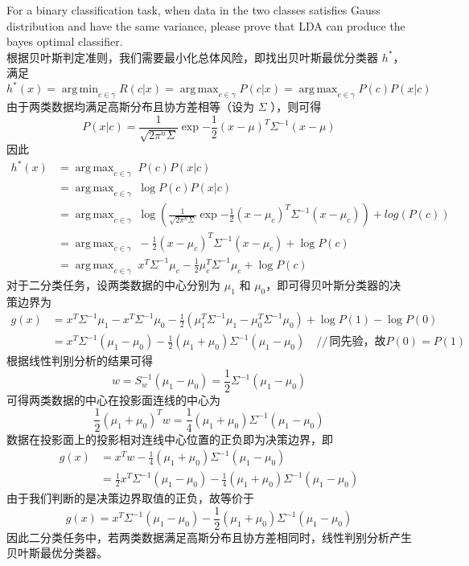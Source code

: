 \documentclass{article}
\DeclareMathOperator*{\argmax}{arg\,max}
\DeclareMathOperator*{\argmin}{arg\,min}
\begin{document}
	For a binary classification task, when data in the two classes satisfies Gauss distribution and have the same variance, please prove that LDA can produce the bayes optimal classifier. \\
	根据贝叶斯判定准则，我们需要最小化总体风险，即找出贝叶斯最优分类器 $h^*$，满足 
	\[h^*(x) = \argmin_{c\in\gamma} R(c|x) = \argmax_{c\in\gamma}P(c|x) = \argmax_{c\in\gamma} P(c)P(x|c) \]
	由于两类数据均满足高斯分布且协方差相等（设为 $\Sigma$ ），则可得
	\[ P(x|c) = \frac{1}{\sqrt{2\pi^{n}\Sigma}}\exp{-\frac{1}{2}(x-\mu)^T\Sigma^{-1}(x-\mu)} \]
	因此
	\begin{align*}
	h^*(x)
	&= \argmax_{c\in\gamma}\;P(c)P(x|c) \\
	&= \argmax_{c\in\gamma}\;\log P(c)P(x|c) \\
	&= \argmax_{c\in\gamma}\;\log(\frac{1}{\sqrt{2\pi^{n}\Sigma}}\exp{-\frac{1}{2}(x-\mu_c)^T\Sigma^{-1}(x-\mu_c)}) + log(P(c)) \\
	&= \argmax_{c\in\gamma}\;-\frac{1}{2}(x-\mu_c)^T\Sigma^{-1}(x-\mu_c) + \log P(c) \\
	&= \argmax_{c\in\gamma}\;x^T\Sigma^{-1}\mu_c - \frac{1}{2}\mu_c^T\Sigma^{-1}\mu_c + \log P(c)
	\end{align*}
	对于二分类任务，设两类数据的中心分别为 $\mu_1$ 和 $\mu_0$，即可得贝叶斯分类器的决策边界为
	\begin{align*}
	g(x)
	&= x^T\Sigma^{-1}\mu_1 - x^T\Sigma^{-1}\mu_0 - \frac{1}{2}(\mu_1^T\Sigma^{-1}\mu_1 - \mu_0^T\Sigma^{-1}\mu_0) + \log P(1) - \log P(0) \\
	&= x^T\Sigma^{-1}(\mu_1-\mu_0) - \frac{1}{2}(\mu_1+\mu_0)\Sigma^{-1}(\mu_1-\mu_0) \quad //\,\text{同先验，故} P(0) = P(1)
	\end{align*}
	根据线性判别分析的结果可得
	\[ w = S_w^{-1} (\mu_1-\mu_0) = \frac{1}{2}\Sigma^{-1}(\mu_1-\mu_0) \]
	可得两类数据的中心在投影面连线的中心为 
	\[\frac{1}{2}(\mu_1+\mu_0)^Tw = \frac{1}{4}(\mu_1+\mu_0)\Sigma^{-1}(\mu_1-\mu_0) \]
	数据在投影面上的投影相对连线中心位置的正负即为决策边界，即
	\begin{align*}
	g(x) 
	&= x^Tw - \frac{1}{4}(\mu_1+\mu_0)\Sigma^{-1}(\mu_1-\mu_0) \\
	&= \frac{1}{2}x^T\Sigma^{-1}(\mu_1-\mu_0) - \frac{1}{4}(\mu_1+\mu_0)\Sigma^{-1}(\mu_1-\mu_0)
	\end{align*}
	由于我们判断的是决策边界取值的正负，故等价于
	\[ g(x) = x^T\Sigma^{-1}(\mu_1-\mu_0) - \frac{1}{2}(\mu_1+\mu_0)\Sigma^{-1}(\mu_1-\mu_0) \]
	因此二分类任务中，若两类数据满足高斯分布且协方差相同时，线性判别分析产生贝叶斯最优分类器。\\
\end{document}

